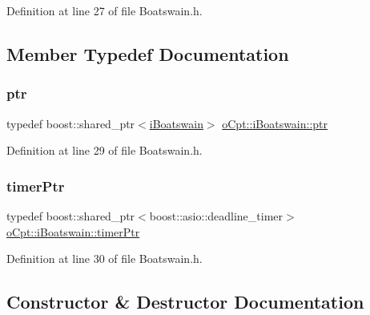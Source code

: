 Definition at line 27 of file Boatswain.\+h.



\subsection{Member Typedef Documentation}
\hypertarget{classo_cpt_1_1i_boatswain_ad5e2819c6252955a7eddba4a4c980e3c}{}\label{classo_cpt_1_1i_boatswain_ad5e2819c6252955a7eddba4a4c980e3c} 
\subsubsection{\texorpdfstring{ptr}{ptr}}
{\footnotesize\ttfamily typedef boost\+::shared\+\_\+ptr$<$\hyperlink{classo_cpt_1_1i_boatswain}{i\+Boatswain}$>$ \hyperlink{classo_cpt_1_1i_boatswain_ad5e2819c6252955a7eddba4a4c980e3c}{o\+Cpt\+::i\+Boatswain\+::ptr}}



Definition at line 29 of file Boatswain.\+h.

\hypertarget{classo_cpt_1_1i_boatswain_ac42d91dd3964880be9475ccaab4231cd}{}\label{classo_cpt_1_1i_boatswain_ac42d91dd3964880be9475ccaab4231cd} 
\subsubsection{\texorpdfstring{timer\+Ptr}{timerPtr}}
{\footnotesize\ttfamily typedef boost\+::shared\+\_\+ptr$<$boost\+::asio\+::deadline\+\_\+timer$>$ \hyperlink{classo_cpt_1_1i_boatswain_ac42d91dd3964880be9475ccaab4231cd}{o\+Cpt\+::i\+Boatswain\+::timer\+Ptr}}



Definition at line 30 of file Boatswain.\+h.



\subsection{Constructor \& Destructor Documentation}
\hypertarget{classo_cpt_1_1i_boatswain_a9424746b673744868f521b7a34a1064a}{}\label{classo_cpt_1_1i_boatswain_a9424746b673744868f521b7a34a1064a} 
